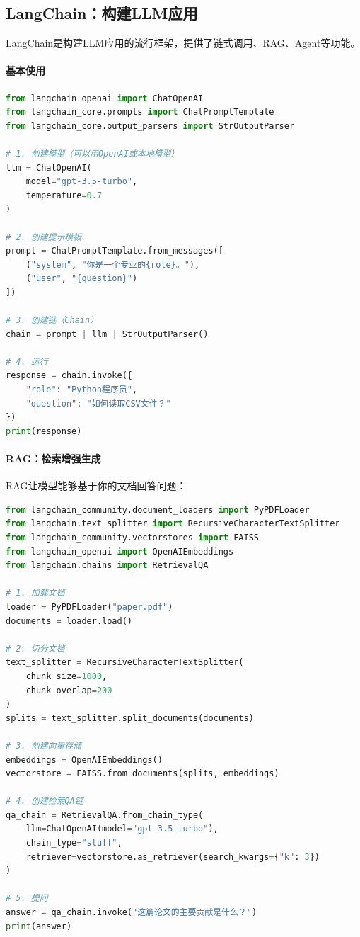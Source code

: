 \subsection*{LangChain：构建LLM应用}

LangChain是构建LLM应用的流行框架，提供了链式调用、RAG、Agent等功能。

\paragraph{基本使用}\mbox{}\par\nopagebreak

\begin{lstlisting}[language=Python, caption=LangChain基本使用]
from langchain_openai import ChatOpenAI
from langchain_core.prompts import ChatPromptTemplate
from langchain_core.output_parsers import StrOutputParser

# 1. 创建模型（可以用OpenAI或本地模型）
llm = ChatOpenAI(
    model="gpt-3.5-turbo",
    temperature=0.7
)

# 2. 创建提示模板
prompt = ChatPromptTemplate.from_messages([
    ("system", "你是一个专业的{role}。"),
    ("user", "{question}")
])

# 3. 创建链（Chain）
chain = prompt | llm | StrOutputParser()

# 4. 运行
response = chain.invoke({
    "role": "Python程序员",
    "question": "如何读取CSV文件？"
})
print(response)
\end{lstlisting}

\paragraph{RAG：检索增强生成}

RAG让模型能够基于你的文档回答问题：

\begin{lstlisting}[language=Python, caption=使用LangChain构建RAG系统]
from langchain_community.document_loaders import PyPDFLoader
from langchain.text_splitter import RecursiveCharacterTextSplitter
from langchain_community.vectorstores import FAISS
from langchain_openai import OpenAIEmbeddings
from langchain.chains import RetrievalQA

# 1. 加载文档
loader = PyPDFLoader("paper.pdf")
documents = loader.load()

# 2. 切分文档
text_splitter = RecursiveCharacterTextSplitter(
    chunk_size=1000,
    chunk_overlap=200
)
splits = text_splitter.split_documents(documents)

# 3. 创建向量存储
embeddings = OpenAIEmbeddings()
vectorstore = FAISS.from_documents(splits, embeddings)

# 4. 创建检索QA链
qa_chain = RetrievalQA.from_chain_type(
    llm=ChatOpenAI(model="gpt-3.5-turbo"),
    chain_type="stuff",
    retriever=vectorstore.as_retriever(search_kwargs={"k": 3})
)

# 5. 提问
answer = qa_chain.invoke("这篇论文的主要贡献是什么？")
print(answer)
\end{lstlisting}

